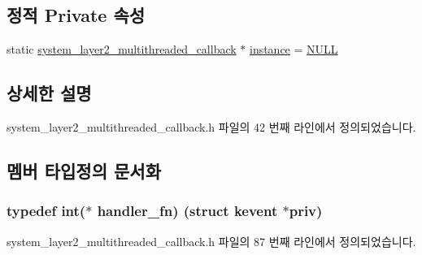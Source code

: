 \subsection*{정적 Private 속성}
\begin{DoxyCompactItemize}
\item 
static \hyperlink{classavdecc__lib_1_1system__layer2__multithreaded__callback}{system\+\_\+layer2\+\_\+multithreaded\+\_\+callback} $\ast$ \hyperlink{classavdecc__lib_1_1system__layer2__multithreaded__callback_a085719c035aa7d479dea20f36118da82}{instance} = \hyperlink{openavb__types__base__pub_8h_a070d2ce7b6bb7e5c05602aa8c308d0c4}{N\+U\+LL}
\end{DoxyCompactItemize}


\subsection{상세한 설명}


system\+\_\+layer2\+\_\+multithreaded\+\_\+callback.\+h 파일의 42 번째 라인에서 정의되었습니다.



\subsection{멤버 타입정의 문서화}
\subsubsection[{\texorpdfstring{handler\+\_\+fn}{handler_fn}}]{\setlength{\rightskip}{0pt plus 5cm}typedef int($\ast$ handler\+\_\+fn) (struct kevent $\ast$priv)\hspace{0.3cm}{\ttfamily [private]}}\hypertarget{classavdecc__lib_1_1system__layer2__multithreaded__callback_aaa185c7bf1c2234dbeee02570d624c7c}{}\label{classavdecc__lib_1_1system__layer2__multithreaded__callback_aaa185c7bf1c2234dbeee02570d624c7c}


system\+\_\+layer2\+\_\+multithreaded\+\_\+callback.\+h 파일의 87 번째 라인에서 정의되었습니다.

